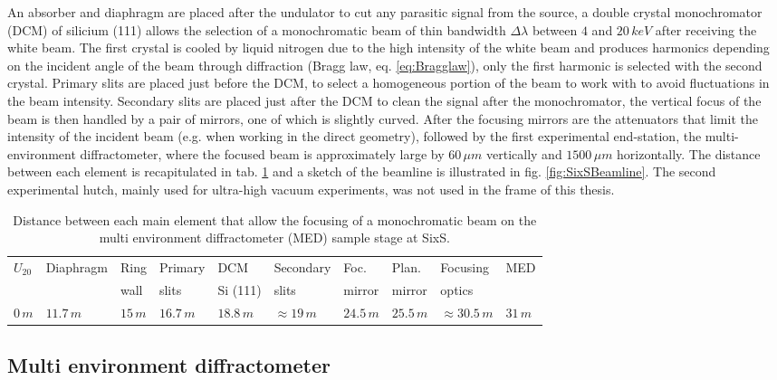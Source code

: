 An absorber and diaphragm are placed after the undulator to cut any parasitic signal from the source, a double crystal monochromator (DCM) of silicium (111) allows the selection of a monochromatic beam of thin bandwidth $\Delta \lambda$ between $4$ and $20 \, keV$ after receiving the white beam.
The first crystal is cooled by liquid nitrogen due to the high intensity of the white beam and produces harmonics depending on the incident angle of the beam through diffraction (Bragg law, eq. \ref{eq:Bragglaw}), only the first harmonic is selected with the second crystal.
Primary slits are placed just before the DCM, to select a homogeneous portion of the beam to work with to avoid fluctuations in the beam intensity.
Secondary slits are placed just after the DCM to clean the signal after the monochromator, the vertical focus of the beam is then handled by a pair of mirrors, one of which is slightly curved.
After the focusing mirrors are the attenuators that limit the intensity of the incident beam (e.g. when working in the direct geometry), followed by the first experimental end-station, the multi-environment diffractometer, where the focused beam is approximately large by $60 \, \mu m$ vertically and $1500 \, \mu m$ horizontally.
The distance between each element is recapitulated in tab. \ref{tab:DistanceSixS} and a sketch of the beamline is illustrated in fig. \ref{fig:SixSBeamline}.
The second experimental hutch, mainly used for ultra-high vacuum experiments, was not used in the frame of this thesis.

\begin{table}[!htb]
	\centering
    \small{
	\begin{tabular}{@{}llllllllll@{}}
	\toprule
	$U_{20}$ & Diaphragm & Ring    & Primary     & DCM         & Secondary       & Foc.      & Plan.     & Focusing &  MED \\
	         &           & wall    & slits       & Si (111)    & slits           & mirror    & mirror    & optics        &  \\
 	\midrule
 	$0 \, m$ &$11.7 \, m$&$15 \, m$& $16.7 \, m$ & $18.8 \, m$ &$\approx 19 \, m$&$24.5 \, m$&$25.5 \, m$&$\approx 30.5 \,  m$ & $31 \, m$
	\end{tabular}
    }
	\caption{
		Distance between each main element that allow the focusing of a monochromatic beam on the multi environment diffractometer (MED) sample stage at SixS.
	}
    \label{tab:DistanceSixS}
\end{table}

\subsection{Multi environment diffractometer}

